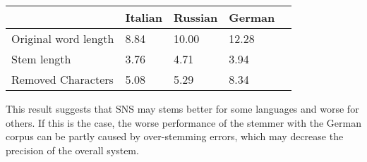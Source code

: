 \begin{center}
   \begin{tabular}{| l | l | l | l | l |}
    \hline
    & Italian & Russian & German\\ \hline
    Original word length & 8.84 & 10.00 & 12.28\\ \hline
    Stem length & 3.76 & 4.71 & 3.94\\ \hline   
    Removed Characters & 5.08 & 5.29 &  8.34\\ \hline
    \end{tabular}
    \label{tab:length}
\end{center}

This result suggests that SNS may stems better for some languages and worse for others. If this is the case, the worse performance of the stemmer with the German corpus can be partly caused by over-stemming errors, which may decrease the precision of the overall system.